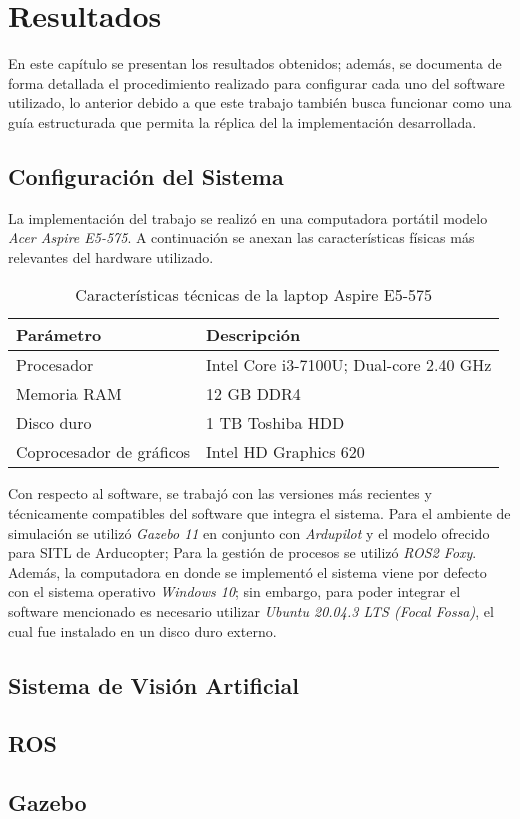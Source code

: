 \chapter{Resultados}

En este capítulo se presentan los resultados obtenidos; además, se documenta de forma detallada el procedimiento realizado para configurar cada uno del software utilizado, lo anterior debido a que este trabajo también busca funcionar como una guía estructurada que permita la réplica del la implementación desarrollada.

\section{Configuración del Sistema}
La implementación del trabajo se realizó en una computadora portátil modelo \textit{Acer Aspire E5-575}. A continuación se anexan las características físicas más relevantes del hardware utilizado.

\begin{table}
    \centering
    \begin{tabular}{||l|l||}
        \hline
        Parámetro & Descripción\\
        \hline
        Procesador & Intel Core i3-7100U; Dual-core 2.40 GHz\\
        Memoria RAM & 12 GB DDR4\\
        Disco duro & 1 TB Toshiba HDD\\
        Coprocesador de gráficos & Intel HD Graphics 620\\
        \hline
    \end{tabular}
    \caption{Características técnicas de la laptop Aspire E5-575}
    \label{tab:specs}
\end{table}

Con respecto al software, se trabajó con las versiones más recientes y técnicamente compatibles del software que integra el sistema. Para el ambiente de simulación se utilizó \textit{Gazebo 11} en conjunto con \textit{Ardupilot} y el modelo ofrecido para SITL de Arducopter; Para la gestión de procesos se utilizó \textit{ROS2 Foxy}. Además, la computadora en donde se implementó el sistema viene por defecto con el sistema operativo \textit{Windows 10}; sin embargo, para poder integrar el software mencionado es necesario utilizar \textit{Ubuntu 20.04.3 LTS (Focal Fossa)}, el cual fue instalado en un disco duro externo.


\section{Sistema de Visión Artificial}

\section{ROS}

\section{Gazebo}

